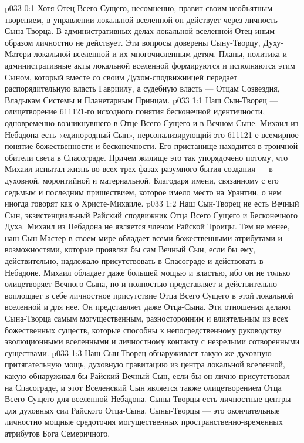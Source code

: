 \author{Глава Архангелов}
\vs p033 0:1 Хотя Отец Всего Сущего, несомненно, правит своим необъятным творением, в управлении локальной вселенной он действует через личность Сына\hyp{}Творца. В административных делах локальной вселенной Отец иным образом личностно не действует. Эти вопросы доверены Сыну\hyp{}Творцу, Духу\hyp{}Матери локальной вселенной и их многочисленным детям. Планы, политика и административные акты локальной вселенной формируются и исполняются этим Сыном, который вместе со своим Духом\hyp{}сподвижницей передает распорядительную власть Гавриилу, а судебную власть --- Отцам Созвездия, Владыкам Системы и Планетарным Принцам.
\vs p033 1:1 Наш Сын\hyp{}Творец --- олицетворение 611121\hyp{}го исходного понятия бесконечной идентичности, одновременно возникнувшего в Отце Всего Сущего и в Вечном Сыне. Михаил из Небадона есть «единородный Сын», персонализирующий это 611121\hyp{}е всемирное понятие божественности и бесконечности. Его пристанище находится в троичной обители света в Спасограде. Причем жилище это так упорядочено потому, что Михаил испытал жизнь во всех трех фазах разумного бытия создания --- в духовной, моронтийной и материальной. Благодаря имени, связанному с его седьмым и последним пришествием, которое имело место на Урантии, о нем иногда говорят как о Христе\hyp{}Михаиле.
\vs p033 1:2 Наш Сын\hyp{}Творец не есть Вечный Сын, экзистенциальный Райский сподвижник Отца Всего Сущего и Бесконечного Духа. Михаил из Небадона не является членом Райской Троицы. Тем не менее, наш Сын\hyp{}Мастер в своем мире обладает всеми божественными атрибутами и возможностями, которые проявлял бы сам Вечный Сын, если бы ему, действительно, надлежало присутствовать в Спасограде и действовать в Небадоне. Михаил обладает даже большей мощью и властью, ибо он не только олицетворяет Вечного Сына, но и полностью представляет и действительно воплощает в себе личностное присутствие Отца Всего Сущего в этой локальной вселенной и для нее. Он представляет даже Отца\hyp{}Сына. Эти отношения делают Сына\hyp{}Творца самым могущественным, разносторонним и влиятельным из всех божественных существ, которые способны к непосредственному руководству эволюционными вселенными и личностному контакту с незрелыми сотворенными существами.
\vs p033 1:3 Наш Сын\hyp{}Творец обнаруживает такую же духовную притягательную мощь, духовную гравитацию из центра локальной вселенной, какую обнаруживал бы Райский Вечный Сын, если бы он лично присутствовал на Спасограде, и  этот Вселенский Сын является также олицетворением Отца Всего Сущего для вселенной Небадона. Сыны\hyp{}Творцы есть личностные центры для духовных сил Райского Отца\hyp{}Сына. Сыны\hyp{}Творцы --- это окончательные личностно мощные средоточия могущественных пространственно\hyp{}временных атрибутов Бога Семеричного.
